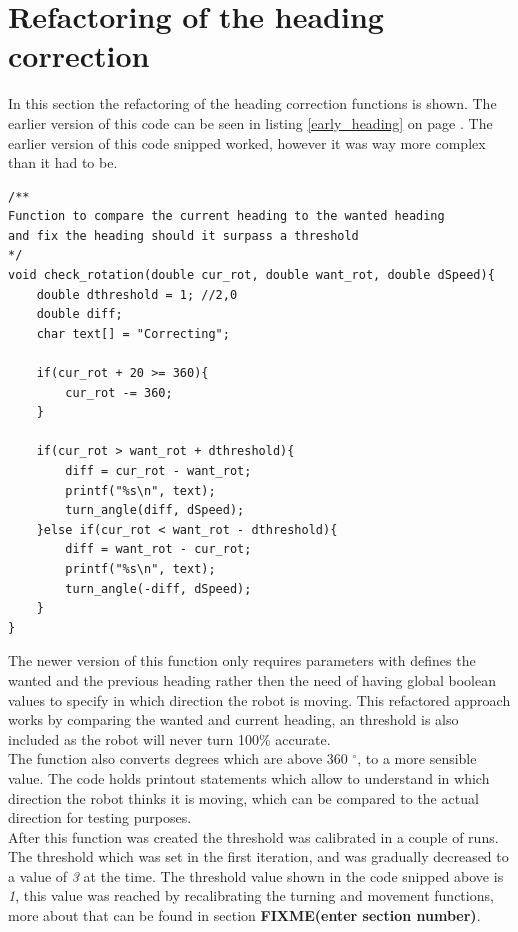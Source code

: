 \section{Refactoring of the heading correction}
In this section the refactoring of the heading correction functions is shown. 
The earlier version of this code can be seen in listing \ref{early_heading} on page \pageref{early_heading}.
The earlier version of this code snipped worked, however it was way more complex than it had to be. 

\begin{lstlisting}[caption={Refactored heading control code} ]
/**
Function to compare the current heading to the wanted heading
and fix the heading should it surpass a threshold
*/
void check_rotation(double cur_rot, double want_rot, double dSpeed){
	double dthreshold = 1; //2,0
	double diff;
	char text[] = "Correcting";
	
	if(cur_rot + 20 >= 360){
		cur_rot -= 360; 
	} 
	
	if(cur_rot > want_rot + dthreshold){
		diff = cur_rot - want_rot;
		printf("%s\n", text);
		turn_angle(diff, dSpeed);
	}else if(cur_rot < want_rot - dthreshold){
		diff = want_rot - cur_rot;
		printf("%s\n", text);
		turn_angle(-diff, dSpeed);
	}
}
\end{lstlisting}

The newer version of this function only requires parameters with defines the wanted and the previous heading rather then the need of having global boolean values to specify in which direction the robot is moving. 
This refactored approach works by comparing the wanted and current heading, an threshold is also included as the robot will never turn 100\% accurate. \\
The function also converts degrees which are above 360 $^{\circ}$, to a more sensible value. 
The code holds printout statements which allow to understand in which direction the robot thinks it is moving, which can be compared to the actual direction for testing purposes. \\[3ex]

After this function was created the threshold was calibrated in a couple of runs. The threshold which was set in the first iteration, and was gradually decreased to a value of \textit{3} at the time. The threshold value shown in the code snipped above is \textit{1}, this value was reached by recalibrating the turning and movement functions, more about that can be found in section \textbf{FIXME(enter section number)}.

